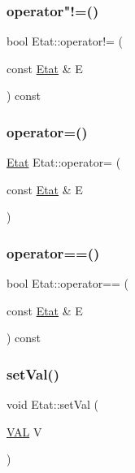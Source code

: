 \mbox{\label{class_etat_a676159ce9be48a79d647f93cd9faee6e}} 
\subsubsection{\texorpdfstring{operator"!=()}{operator!=()}}
{\footnotesize\ttfamily bool Etat\+::operator!= (\begin{DoxyParamCaption}\item[{const \hyperlink{class_etat}{Etat} \&}]{E }\end{DoxyParamCaption}) const}

\mbox{\label{class_etat_ad400bb5d992ce25d27d56832fa0a9872}} 
\subsubsection{\texorpdfstring{operator=()}{operator=()}}
{\footnotesize\ttfamily \hyperlink{class_etat}{Etat} Etat\+::operator= (\begin{DoxyParamCaption}\item[{const \hyperlink{class_etat}{Etat} \&}]{E }\end{DoxyParamCaption})}

\mbox{\label{class_etat_afa4f3f731268802b2a9c693cb738707b}} 
\subsubsection{\texorpdfstring{operator==()}{operator==()}}
{\footnotesize\ttfamily bool Etat\+::operator== (\begin{DoxyParamCaption}\item[{const \hyperlink{class_etat}{Etat} \&}]{E }\end{DoxyParamCaption}) const}

\mbox{\label{class_etat_aa88987ca54aee676717f05e4570c0aec}} 
\subsubsection{\texorpdfstring{set\+Val()}{setVal()}}
{\footnotesize\ttfamily void Etat\+::set\+Val (\begin{DoxyParamCaption}\item[{\hyperlink{class_etat_af3ddb2296ffc379b7f3ad2bf832f294e}{V\+AL}}]{V }\end{DoxyParamCaption})}

